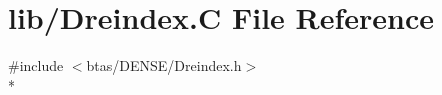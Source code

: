 \section{lib/\-Dreindex.C File Reference}
\label{d0/d4a/Dreindex_8C}
{\ttfamily \#include $<$btas/\-D\-E\-N\-S\-E/\-Dreindex.\-h$>$}\\*
